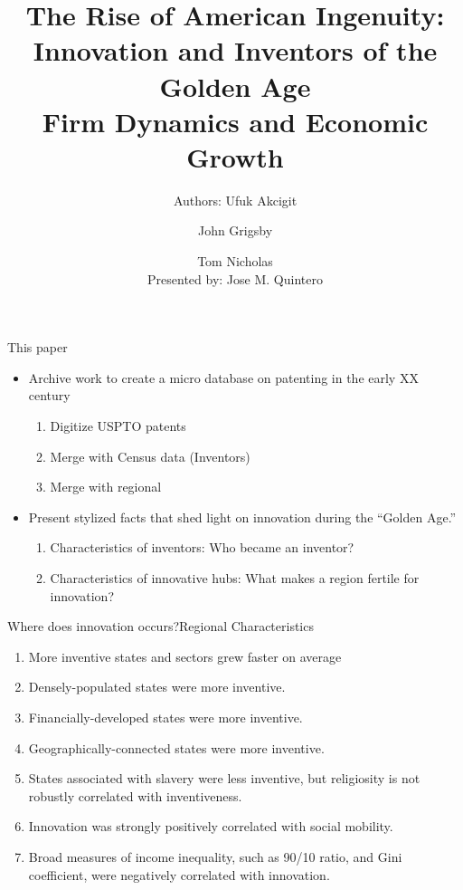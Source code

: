 \documentclass[usenames,dvipsnames,aspectratio=169]{beamer}
\title{The Rise of American Ingenuity: Innovation and Inventors of the Golden Age \\ \small{Firm Dynamics and Economic Growth} }
\author{Authors: Ufuk Akcigit \and John Grigsby \and Tom Nicholas \\ Presented by: Jose M. Quintero}
\begin{document}
\begin{frame}
  \titlepage
\end{frame}

\begin{frame}{This paper}
\begin{itemize}[label=\textcolor{teal}{$\blacktriangleright$}]
	\item Archive work to create a micro database on patenting in the early XX century
	\begin{enumerate}[label=\textbf{\textcolor{teal}{\arabic*.}}]
		\item Digitize USPTO patents
		\item Merge with Census data (Inventors)
		\item Merge with regional 
	\end{enumerate}
	\vfill
	\item Present stylized facts  that shed light on innovation during the ``Golden Age.''
	\begin{enumerate}[label=\textbf{\textcolor{teal}{\arabic*.}}]
		\item Characteristics of inventors: Who became an inventor?
		\item Characteristics of innovative hubs: What makes a region fertile for innovation?
	\end{enumerate}
\end{itemize}
\end{frame}

\begin{frame}{Where does innovation occurs?}{Regional Characteristics}
\begin{enumerate}[label=\textcolor{teal}{R\arabic*.}]
\vfill
\item More inventive states and sectors grew faster on average  
\vfill
\item Densely-populated states were more inventive. 
\vfill
\item Financially-developed states were more inventive.
\vfill
\item Geographically-connected states were more inventive.
\vfill
\item States associated with slavery were less inventive, but religiosity is not robustly correlated with inventiveness.
\vfill
\item Innovation was strongly positively correlated with social mobility.
\vfill
\item Broad measures of income inequality, such as 90/10 ratio, and Gini coefficient, were negatively correlated with innovation.
\vfill
\end{enumerate}
\end{frame}
\end{document}
